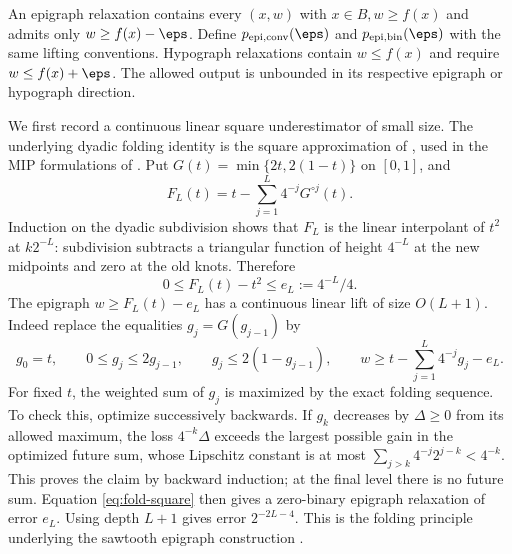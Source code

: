 An epigraph relaxation contains every $(x,w)$ with $x\in B,w\ge f(x)$
and admits only $w\ge f(x)-\eps$. Define
$p_{\mathrm{epi,conv}}(\eps)$ and $p_{\mathrm{epi,bin}}(\eps)$ with the
same lifting conventions. Hypograph relaxations contain $w\le f(x)$
and require $w\le f(x)+\eps$. The allowed output is unbounded in its
respective epigraph or hypograph direction.

We first record a continuous linear square underestimator of small
size. The underlying dyadic folding identity is the square approximation
of \citet[Proposition 2]{yarotsky2017}, used in the MIP formulations of
\citet{beach2022}. Put $G(t)=\min\{2t,2(1-t)\}$ on $[0,1]$, and
\[
 F_L(t)=t-\sum_{j=1}^L4^{-j}G^{\circ j}(t).
\]
Induction on the dyadic subdivision shows that $F_L$ is the linear
interpolant of $t^2$ at $k2^{-L}$: subdivision subtracts a triangular
function of height $4^{-L}$ at the new midpoints and zero at the old
knots. Therefore
\begin{equation}\label{eq:fold-square}
 0\le F_L(t)-t^2\le e_L:=4^{-L}/4.
\end{equation}
The epigraph $w\ge F_L(t)-e_L$ has a continuous linear lift of size
$O(L+1)$. Indeed replace the equalities $g_j=G(g_{j-1})$ by
\[
 g_0=t,\qquad 0\le g_j\le2g_{j-1},\qquad
 g_j\le2(1-g_{j-1}),\qquad
 w\ge t-\sum_{j=1}^L4^{-j}g_j-e_L.
\]
For fixed $t$, the weighted sum of $g_j$ is maximized by the exact
folding sequence. To check this, optimize successively backwards. If
$g_k$ decreases by $\Delta\ge0$ from its allowed maximum, the loss
$4^{-k}\Delta$ exceeds the largest possible gain in the optimized
future sum, whose Lipschitz constant is at most
$\sum_{j>k}4^{-j}2^{j-k}<4^{-k}$. This proves the claim by backward
induction; at the final level there is no future sum. Equation
\eqref{eq:fold-square} then gives a zero-binary epigraph relaxation of
error $e_L$. Using depth $L+1$ gives error $2^{-2L-4}$. This is the
folding principle underlying the sawtooth epigraph construction
\citep{beach2024}.

